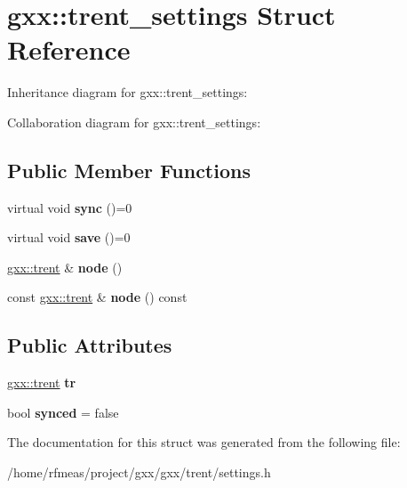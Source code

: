 \hypertarget{structgxx_1_1trent__settings}{}\section{gxx\+:\+:trent\+\_\+settings Struct Reference}
\label{structgxx_1_1trent__settings}


Inheritance diagram for gxx\+:\+:trent\+\_\+settings\+:


Collaboration diagram for gxx\+:\+:trent\+\_\+settings\+:
\subsection*{Public Member Functions}
\begin{DoxyCompactItemize}
\item 
virtual void {\bfseries sync} ()=0\hypertarget{structgxx_1_1trent__settings_a45b9e7e988b51c81b14d52b298a866f0}{}\label{structgxx_1_1trent__settings_a45b9e7e988b51c81b14d52b298a866f0}

\item 
virtual void {\bfseries save} ()=0\hypertarget{structgxx_1_1trent__settings_a5ccf0a501f6e2dad21f893a63c4a4cdd}{}\label{structgxx_1_1trent__settings_a5ccf0a501f6e2dad21f893a63c4a4cdd}

\item 
\hyperlink{classgxx_1_1trent}{gxx\+::trent} \& {\bfseries node} ()\hypertarget{structgxx_1_1trent__settings_a43fb1071f1cc9f4f7db2cf6d7399ccd8}{}\label{structgxx_1_1trent__settings_a43fb1071f1cc9f4f7db2cf6d7399ccd8}

\item 
const \hyperlink{classgxx_1_1trent}{gxx\+::trent} \& {\bfseries node} () const \hypertarget{structgxx_1_1trent__settings_aeff500d7e878ba7a25f879cb0c44f7ee}{}\label{structgxx_1_1trent__settings_aeff500d7e878ba7a25f879cb0c44f7ee}

\end{DoxyCompactItemize}
\subsection*{Public Attributes}
\begin{DoxyCompactItemize}
\item 
\hyperlink{classgxx_1_1trent}{gxx\+::trent} {\bfseries tr}\hypertarget{structgxx_1_1trent__settings_ae4bf3faafd7ebe8a97f36f6e2be1972e}{}\label{structgxx_1_1trent__settings_ae4bf3faafd7ebe8a97f36f6e2be1972e}

\item 
bool {\bfseries synced} = false\hypertarget{structgxx_1_1trent__settings_a51a15b46d3b547d1cd9b6394d3957afd}{}\label{structgxx_1_1trent__settings_a51a15b46d3b547d1cd9b6394d3957afd}

\end{DoxyCompactItemize}


The documentation for this struct was generated from the following file\+:\begin{DoxyCompactItemize}
\item 
/home/rfmeas/project/gxx/gxx/trent/settings.\+h\end{DoxyCompactItemize}
